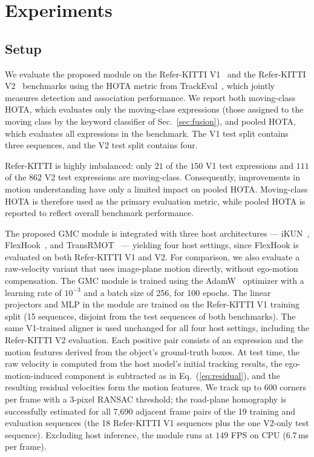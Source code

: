 \documentclass{article}
\begin{document}
\section{Experiments}
\label{sec:exp}


\subsection{Setup}
\label{sec:setup}
We evaluate the proposed module on the Refer-KITTI V1~\cite{transrmot} and the Refer-KITTI V2~\cite{temprmot} benchmarks using the HOTA metric from TrackEval~\cite{hota}, which jointly measures detection and association performance. We report both moving-class HOTA, which evaluates only the moving-class expressions (those assigned to the moving class by the keyword classifier of Sec.~\ref{sec:fusion}), and pooled HOTA, which evaluates all expressions in the benchmark. The V1 test split contains three sequences, and the V2 test split contains four.

Refer-KITTI is highly imbalanced: only $21$ of the $150$ V1 test expressions and $111$ of the $862$ V2 test expressions are moving-class. Consequently, improvements in motion understanding have only a limited impact on pooled HOTA. Moving-class HOTA is therefore used as the primary evaluation metric, while pooled HOTA is reported to reflect overall benchmark performance.

The proposed GMC module is integrated with three host architectures --- iKUN~\cite{ikun}, FlexHook~\cite{flexhook}, and TransRMOT~\cite{transrmot} --- yielding four host settings, since FlexHook is evaluated on both Refer-KITTI V1 and V2. For comparison, we also evaluate a raw-velocity variant that uses image-plane motion directly, without ego-motion compensation. The GMC module is trained using the AdamW~\cite{adamw} optimizer with a learning rate of $10^{-3}$ and a batch size of 256, for 100 epochs. The linear projectors and MLP in the module are trained on the Refer-KITTI V1 training split (15 sequences, disjoint from the test sequences of both benchmarks). The same V1-trained aligner is used unchanged for all four host settings, including the Refer-KITTI V2 evaluation. Each positive pair consists of an expression and the motion features derived from the object's ground-truth boxes. At test time, the raw velocity is computed from the host model's initial tracking results, the ego-motion-induced component is subtracted as in Eq.~(\ref{eq:residual}), and the resulting residual velocities form the motion features. We track up to 600 corners per frame with a 3-pixel RANSAC threshold; the road-plane homography is successfully estimated for all 7,690 adjacent frame pairs of the 19 training and evaluation sequences (the 18 Refer-KITTI V1 sequences plus the one V2-only test sequence). Excluding host inference, the module runs at $149$ FPS on CPU ($6.7$\,ms per frame).
\end{document}
